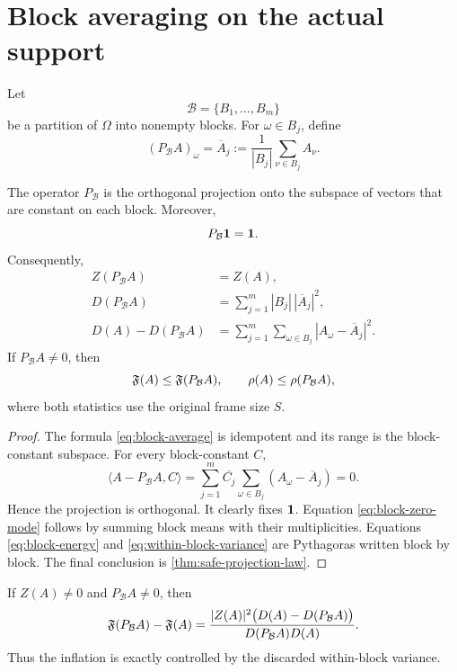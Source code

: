 \section{Block averaging on the actual support}
\label{sec:block-averaging}

Let
\[
 \mathcal B=\{B_1,\ldots,B_m\}
\]
be a partition of \(\Omega\) into nonempty blocks.  For
\(\omega\in B_j\), define
\begin{equation}
 (P_{\mathcal B}A)_\omega
 =
 \overline A_j
 :=
 \frac{1}{|B_j|}
 \sum_{\nu\in B_j}A_\nu.
\label{eq:block-average}
\end{equation}

\begin{proposition}
\label{prop:block-safe}
The operator \(P_{\mathcal B}\) is the orthogonal projection onto
the subspace of vectors that are constant on each block.  Moreover,
\[
 P_{\mathcal B}\mathbf 1=\mathbf 1.
\]
Consequently,
\begin{align}
 Z(P_{\mathcal B}A)&=Z(A),
\label{eq:block-zero-mode}\\
 D(P_{\mathcal B}A)
 &=
 \sum_{j=1}^m |B_j|\,|\overline A_j|^2,
\label{eq:block-energy}\\
 D(A)-D(P_{\mathcal B}A)
 &=
 \sum_{j=1}^m\sum_{\omega\in B_j}
 |A_\omega-\overline A_j|^2.
\label{eq:within-block-variance}
\end{align}
If \(P_{\mathcal B}A\ne0\), then
\[
 \mathfrak F(A)\le\mathfrak F(P_{\mathcal B}A),
\qquad
 \rho(A)\le\rho(P_{\mathcal B}A),
\]
where both statistics use the original frame size \(S\).
\end{proposition}

\begin{proof}
The formula \eqref{eq:block-average} is idempotent and its range is
the block-constant subspace.  For every block-constant \(C\),
\[
 \langle A-P_{\mathcal B}A,C\rangle
 =
 \sum_{j=1}^m
 \overline{C_j}
 \sum_{\omega\in B_j}
 (A_\omega-\overline A_j)
 =0.
\]
Hence the projection is orthogonal.  It clearly fixes \(\mathbf 1\).
Equation \eqref{eq:block-zero-mode} follows by summing block means
with their multiplicities.  Equations \eqref{eq:block-energy} and
\eqref{eq:within-block-variance} are Pythagoras written block by
block.  The final conclusion is
\cref{thm:safe-projection-law}.
\end{proof}

\begin{corollary}
\label{cor:block-flatness-gap}
If \(Z(A)\ne0\) and \(P_{\mathcal B}A\ne0\), then
\begin{equation}
 \mathfrak F(P_{\mathcal B}A)-\mathfrak F(A)
 =
 \frac{|Z(A)|^2
 \bigl(D(A)-D(P_{\mathcal B}A)\bigr)}
 {D(P_{\mathcal B}A)D(A)}.
\label{eq:flatness-gap}
\end{equation}
Thus the inflation is exactly controlled by the discarded
within-block variance.
\end{corollary}

